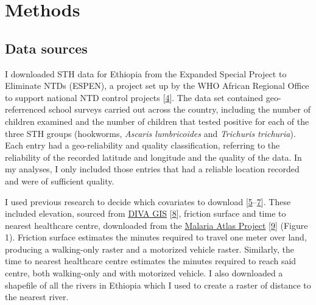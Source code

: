\documentclass[
]{article}
\begin{document}
\hypertarget{methods}{%
\section{Methods}\label{methods}}

\hypertarget{data-sources}{%
\subsection{Data sources}\label{data-sources}}

I downloaded STH data for Ethiopia from the Expanded Special Project to
Eliminate NTDs (ESPEN), a project set up by the WHO African Regional
Office to support national NTD control projects
{[}\protect\hyperlink{ref-ESPENExpandedSpecial}{4}{]}. The data set
contained geo-referrenced school surveys carried out across the country,
including the number of children examined and the number of children
that tested positive for each of the three STH groups (hookworms,
\emph{Ascaris lumbricoides} and \emph{Trichuris trichuria}). Each entry
had a geo-reliability and quality classification, referring to the
reliability of the recorded latitude and longitude and the quality of
the data. In my analyses, I only included those entries that had a
reliable location recorded and were of sufficient quality.

I used previous research to decide which covariates to download
{[}\protect\hyperlink{ref-alelignSoilTransmittedHelminthInfections2015}{5}--\protect\hyperlink{ref-eyayuPrevalenceIntensityInfection2022}{7}{]}.
These included elevation, sourced from
\href{https://www.diva-gis.org/}{DIVA GIS}
{[}\protect\hyperlink{ref-DIVAGISFreeSimple}{8}{]}, friction surface and
time to nearest healthcare centre, downloaded from the
\href{https://malariaatlas.org/}{Malaria Atlas Project}
{[}\protect\hyperlink{ref-MalariaAtlasProject}{9}{]} (Figure 1).
Friction surface estimates the minutes required to travel one meter over
land, producing a walking-only raster and a motorized vehicle raster.
Similarly, the time to nearest healthcare centre estimates the minutes
required to reach said centre, both walking-only and with motorized
vehicle. I also downloaded a shapefile of all the rivers in Ethiopia
which I used to create a raster of distance to the nearest river.
\end{document}

